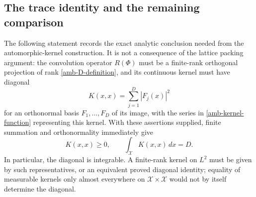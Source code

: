 \subsection{The trace identity and the remaining comparison}

The following statement records the exact analytic conclusion
needed from the automorphic-kernel construction. It is not a
consequence of the lattice packing argument: the convolution
operator $R(\Phi)$ must be a finite-rank orthogonal projection
of rank \eqref{amb-D-definition}, and its continuous kernel must
have diagonal
\begin{equation}\label{amb-projection-diagonal}
                  K(x,x)=\sum_{j=1}^D|F_j(x)|^2
\end{equation}
for an orthonormal basis $F_1,\ldots,F_D$ of its image, with
the series in \eqref{amb-kernel-function} representing this
kernel. With these assertions supplied, finite summation and
orthonormality immediately give
\begin{equation}\label{amb-trace}
                 K(x,x)\ge0,\qquad
                 \int_{\mathcal X}K(x,x)\,dx=D.
\end{equation}
In particular, the diagonal is integrable. A finite-rank kernel
on $L^2$ must be given by such representatives, or an equivalent
proved diagonal identity; equality of measurable kernels only
almost everywhere on $\mathcal X\times\mathcal X$ would not
by itself determine the diagonal.

